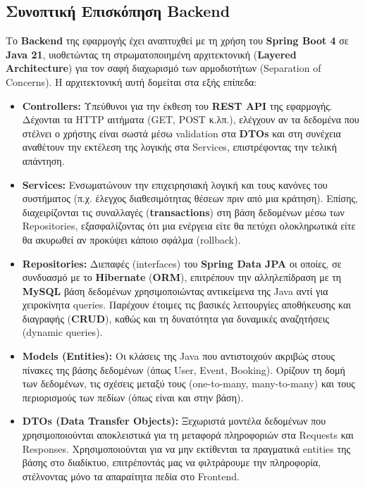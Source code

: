 \documentclass[12pt]{fphw}
\newcommand{\en}[1]{\foreignlanguage{english}{#1}}
\begin{document}
\subsection{Συνοπτική Επισκόπηση Backend}
Το \en{\textbf{Backend}} της εφαρμογής έχει αναπτυχθεί με τη χρήση του \en{\textbf{Spring Boot 4}} σε \en{\textbf{Java 21}}, υιοθετώντας τη στρωματοποιημένη αρχιτεκτονική (\en{\textbf{Layered Architecture}}) για τον σαφή διαχωρισμό των αρμοδιοτήτων (\en{Separation of Concerns}). Η αρχιτεκτονική αυτή δομείται στα εξής επίπεδα:
\begin{itemize}[label=\textbullet]
    \item \en{\textbf{Controllers:}} Υπεύθυνοι για την έκθεση του \en{\textbf{REST API}} της εφαρμογής. Δέχονται τα \en{HTTP} αιτήματα (\en{GET, POST} κ.λπ.), ελέγχουν αν τα δεδομένα που στέλνει ο χρήστης είναι σωστά μέσω \en{validation} στα \en{\textbf{DTOs}} και στη συνέχεια αναθέτουν την εκτέλεση της λογικής στα \en{Services}, επιστρέφοντας την τελική απάντηση.
    \item \en{\textbf{Services:}} Ενσωματώνουν την επιχειρησιακή λογική και τους κανόνες του συστήματος (π.χ. έλεγχος διαθεσιμότητας θέσεων πριν από μια κράτηση). Επίσης, διαχειρίζονται τις συναλλαγές (\en{\textbf{transactions}}) στη βάση δεδομένων μέσω των \en{Repositories}, εξασφαλίζοντας ότι μια ενέργεια είτε θα πετύχει ολοκληρωτικά είτε θα ακυρωθεί αν προκύψει κάποιο σφάλμα (\en{rollback}).
    \item \en{\textbf{Repositories:}} Διεπαφές (\en{interfaces}) του \en{\textbf{Spring Data JPA}} οι οποίες, σε συνδυασμό με το \en{\textbf{Hibernate}} (\en{\textbf{ORM}}), επιτρέπουν την αλληλεπίδραση με τη \en{\textbf{MySQL}} βάση δεδομένων χρησιμοποιώντας αντικείμενα της \en{Java} αντί για χειροκίνητα \en{queries}. Παρέχουν έτοιμες τις βασικές λειτουργίες αποθήκευσης και διαγραφής (\en{\textbf{CRUD}}), καθώς και τη δυνατότητα για δυναμικές αναζητήσεις (dynamic queries).
    \item \en{\textbf{Models (Entities):}} Οι κλάσεις της \en{Java} που αντιστοιχούν ακριβώς στους πίνακες της βάσης δεδομένων (όπως \en{User, Event, Booking}). Ορίζουν τη δομή των δεδομένων, τις σχέσεις μεταξύ τους (\en{one-to-many, many-to-many}) και τους περιορισμούς των πεδίων (όπως είναι και στην βάση).
    \item \en{\textbf{DTOs (Data Transfer Objects):}} Ξεχωριστά μοντέλα δεδομένων που χρησιμοποιούνται αποκλειστικά για τη μεταφορά πληροφοριών στα \en{Requests} και \en{Responses}. Χρησιμοποιούνται για να μην εκτίθενται τα πραγματικά \en{entities} της βάσης στο διαδίκτυο, επιτρέποντάς μας να φιλτράρουμε την πληροφορία, στέλνοντας μόνο τα απαραίτητα πεδία στο \en{Frontend}.
\end{itemize}
\end{document}
